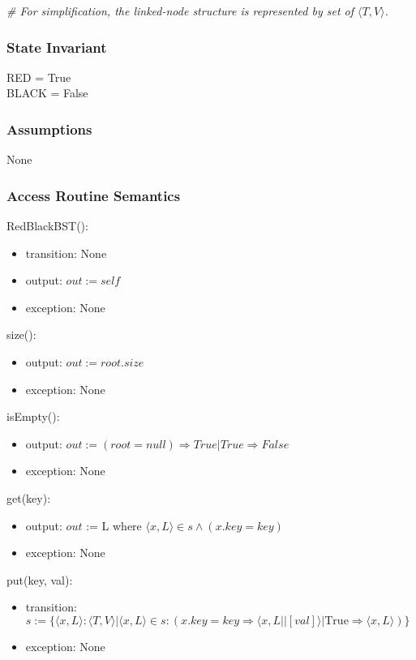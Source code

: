 \documentclass[12pt]{article}
\begin{document}
\noindent \textit{\# For simplification, the linked-node structure is represented by set of $\langle T, V \rangle$.}

\subsubsection* {State Invariant}

RED = True\\
BLACK = False

\subsubsection* {Assumptions}

None

\subsubsection* {Access Routine Semantics}

RedBlackBST():
\begin{itemize}
\item transition: None
\item output: $out := \mathit{self}$
\item exception: None
\end{itemize}

\noindent size():
\begin{itemize}
\item output: $out := root.size$
\item exception: None
\end{itemize}

\noindent isEmpty():
\begin{itemize}
\item output: $out := (root = null) \Rightarrow True | True \Rightarrow False$
\item exception: None
\end{itemize}

\noindent get(key):
\begin{itemize}
\item output: $out$ := L where $\langle x, L \rangle \in s \wedge (x.key = \mathit{key})$
\item exception: None
\end{itemize}

\noindent put(key, val):
\begin{itemize}
\item transition: $s := \{ \langle x, L \rangle : \langle T, V \rangle |
  \langle x, L \rangle \in s : (x.key = \mathit{key} \Rightarrow \langle x, L || [val] \rangle
   | \text{True} \Rightarrow \langle x, L \rangle) \}$

\item exception: None
\end{itemize}
\end{document}

